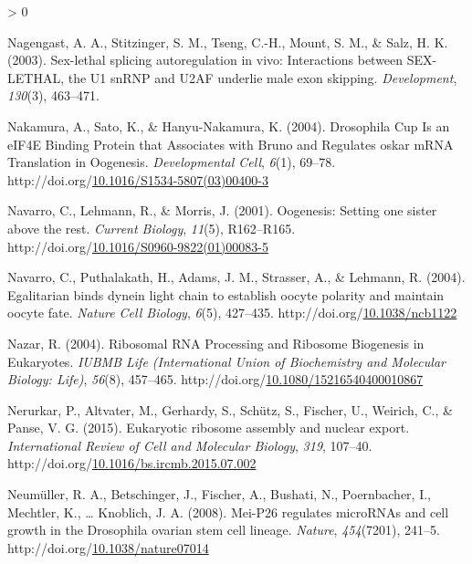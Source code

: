 \documentclass[12pt,oneside]{reedthesis}
\newlength{\cslhangindent}
\newenvironment{CSLReferences}[2] %
 {%
  \setlength{\parindent}{0pt}
  \ifodd #1 \everypar{\setlength{\hangindent}{\cslhangindent}}\ignorespaces\fi
  \ifnum #2 > 0
  \setlength{\parskip}{#2\baselineskip}
  \fi
 }%
 {}
\begin{document}
\begin{CSLReferences}{1}{0}
\leavevmode\hypertarget{ref-Nagengast2003}{}%
Nagengast, A. A., Stitzinger, S. M., Tseng, C.-H., Mount, S. M., \& Salz, H. K. (2003). Sex-lethal splicing autoregulation in vivo: Interactions between {SEX-LETHAL}, the {U1 snRNP} and {U2AF} underlie male exon skipping. \emph{Development}, \emph{130}(3), 463--471.

\leavevmode\hypertarget{ref-Nakamura2004g}{}%
Nakamura, A., Sato, K., \& Hanyu-Nakamura, K. (2004). Drosophila {Cup Is} an {eIF4E Binding Protein} that {Associates} with {Bruno} and {Regulates} oskar {mRNA Translation} in {Oogenesis}. \emph{Developmental Cell}, \emph{6}(1), 69--78. http://doi.org/\href{https://doi.org/10.1016/S1534-5807(03)00400-3}{10.1016/S1534-5807(03)00400-3}

\leavevmode\hypertarget{ref-navarroOogenesisSettingOne2001}{}%
Navarro, C., Lehmann, R., \& Morris, J. (2001). Oogenesis: {Setting} one sister above the rest. \emph{Current Biology}, \emph{11}(5), R162--R165. http://doi.org/\href{https://doi.org/10.1016/S0960-9822(01)00083-5}{10.1016/S0960-9822(01)00083-5}

\leavevmode\hypertarget{ref-Navarro2004b}{}%
Navarro, C., Puthalakath, H., Adams, J. M., Strasser, A., \& Lehmann, R. (2004). Egalitarian binds dynein light chain to establish oocyte polarity and maintain oocyte fate. \emph{Nature Cell Biology}, \emph{6}(5), 427--435. http://doi.org/\href{https://doi.org/10.1038/ncb1122}{10.1038/ncb1122}

\leavevmode\hypertarget{ref-Nazar2004a}{}%
Nazar, R. (2004). Ribosomal {RNA Processing} and {Ribosome Biogenesis} in {Eukaryotes}. \emph{IUBMB Life (International Union of Biochemistry and Molecular Biology: Life)}, \emph{56}(8), 457--465. http://doi.org/\href{https://doi.org/10.1080/15216540400010867}{10.1080/15216540400010867}

\leavevmode\hypertarget{ref-nerurkarEukaryoticRibosomeAssembly2015}{}%
Nerurkar, P., Altvater, M., Gerhardy, S., Schütz, S., Fischer, U., Weirich, C., \& Panse, V. G. (2015). Eukaryotic ribosome assembly and nuclear export. \emph{International Review of Cell and Molecular Biology}, \emph{319}, 107--40. http://doi.org/\href{https://doi.org/10.1016/bs.ircmb.2015.07.002}{10.1016/bs.ircmb.2015.07.002}

\leavevmode\hypertarget{ref-Neumuller2008}{}%
Neumüller, R. A., Betschinger, J., Fischer, A., Bushati, N., Poernbacher, I., Mechtler, K., \ldots{} Knoblich, J. A. (2008). Mei-{P26} regulates {microRNAs} and cell growth in the {Drosophila} ovarian stem cell lineage. \emph{Nature}, \emph{454}(7201), 241--5. http://doi.org/\href{https://doi.org/10.1038/nature07014}{10.1038/nature07014}


\end{CSLReferences}
\end{document}

